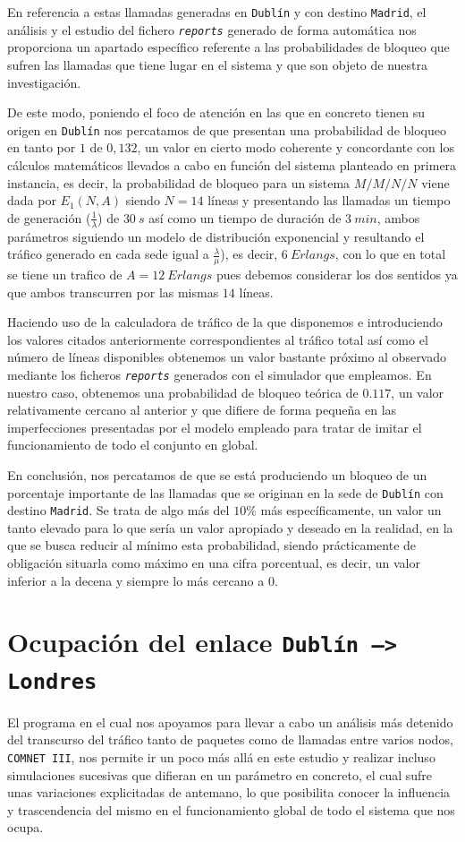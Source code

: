 \documentclass{article}[10pt]
\begin{document}
		En referencia a estas llamadas generadas en \texttt{Dublín} y con destino \texttt{Madrid}, el análisis y el estudio del fichero \texttt{\textit{reports}} generado de forma automática nos proporciona un apartado específico referente a las probabilidades de bloqueo que sufren las llamadas que tiene lugar en el sistema y que son objeto de nuestra investigación.

		De este modo, poniendo el foco de atención en las que en concreto tienen su origen en \texttt{Dublín} nos percatamos de que presentan una probabilidad de bloqueo en tanto por $1$ de $0,132$, un valor en cierto modo coherente y concordante con los cálculos matemáticos llevados a cabo en función del sistema planteado en primera instancia, es decir, la probabilidad de bloqueo para un sistema $M/M/N/N$ viene dada por $E_1(N, A)$ siendo $N = 14$ líneas y presentando las llamadas un tiempo de generación ($\frac{1}{\lambda}$) de $30\ s$ así como un tiempo de duración de $3\ min$, ambos parámetros siguiendo un modelo de distribución exponencial y resultando el tráfico generado en cada sede igual a $\frac{\lambda}{\mu}$), es decir, $6\ Erlangs$, con lo que en total se tiene un trafico de $A = 12\ Erlangs$ pues debemos considerar los dos sentidos ya que ambos transcurren por las mismas $14$ líneas.

		Haciendo uso de la calculadora de tráfico de la que disponemos e introduciendo los valores citados anteriormente correspondientes al tráfico total así como el número de líneas disponibles obtenemos un valor bastante próximo al observado mediante los ficheros \texttt{\textit{reports}} generados con el simulador que empleamos. En nuestro caso, obtenemos una probabilidad de bloqueo teórica de $0.117$, un valor relativamente cercano al anterior y que difiere de forma pequeña en las imperfecciones presentadas por el modelo empleado para tratar de imitar el funcionamiento de todo el conjunto en global.

		En conclusión, nos percatamos de que se está produciendo un bloqueo de un porcentaje importante de las llamadas que se originan en la sede de \texttt{Dublín} con destino \texttt{Madrid}. Se trata de algo más del $10\%$ más específicamente, un valor un tanto elevado para lo que sería un valor apropiado y deseado en la realidad, en la que se busca reducir al mínimo esta probabilidad, siendo prácticamente de obligación situarla como máximo en una cifra porcentual, es decir, un valor inferior a la decena y siempre lo más cercano a $0$.

	\section{Ocupación del enlace \texttt{Dublín --> Londres}}
		El programa en el cual nos apoyamos para llevar a cabo un análisis más detenido del transcurso del tráfico tanto de paquetes como de llamadas entre varios nodos, \texttt{COMNET III}, nos permite ir un poco más allá en este estudio y realizar incluso simulaciones sucesivas que difieran en un parámetro en concreto, el cual sufre unas variaciones explicitadas de antemano, lo que posibilita conocer la influencia y trascendencia del mismo en el funcionamiento global de todo el sistema que nos ocupa.
\end{document}

